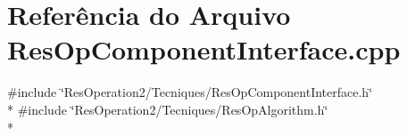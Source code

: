 \section{Referência do Arquivo Res\+Op\+Component\+Interface.\+cpp}
\label{_res_op_component_interface_8cpp}
{\ttfamily \#include \char`\"{}Res\+Operation2/\+Tecniques/\+Res\+Op\+Component\+Interface.\+h\char`\"{}}\\*
{\ttfamily \#include \char`\"{}Res\+Operation2/\+Tecniques/\+Res\+Op\+Algorithm.\+h\char`\"{}}\\*
